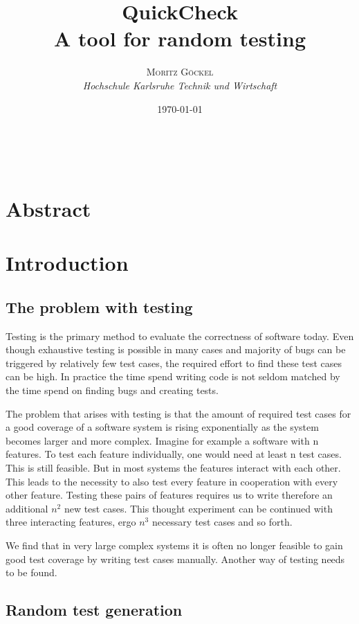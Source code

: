 \documentclass[a4paper, 12pt]{article} %
\title{\textbf{QuickCheck}\\ %
A tool for random testing} %
\author{\textsc{Moritz G\"ockel} %
\\{\textit{Hochschule Karlsruhe Technik und Wirtschaft}}} %
\date{\today}
\makeatletter
\renewcommand{\maketitle}{ 
\begin{flushright} %
{\LARGE\@title} %

\vspace{50pt} %

{\large\@author}
\\\@date 

\vspace{40pt}
\end{flushright}
}
\makeatother
\begin{document}
\maketitle

\vspace{30pt}

\newpage
\tableofcontents
\newpage

\section{Abstract}

\section{Introduction}
\subsection{The problem with testing}

Testing is the primary method to evaluate the correctness of software today. \cite{Ammann2016} Even though exhaustive testing is possible in many cases and majority of bugs can be triggered by relatively few test cases, \cite{Kuhn2004} the required effort to find these test cases can be high. In practice the time spend writing code is not seldom matched by the time spend on finding bugs and creating tests.

The problem that arises with testing is that the amount of required test cases for a good coverage of a software system is rising exponentially as the system becomes larger and more complex. Imagine for example a software with n features. To test each feature individually, one would need at least n test cases. This is still feasible. But in most systems the features interact with each other. This leads to the necessity to also test every feature in cooperation with every other feature. Testing these pairs of features requires us to write therefore an additional $n^2$  new test cases. This thought experiment can be continued with three interacting features, ergo $n^3$ necessary test cases and so forth. \cite{Hughes2016}

We find that in very large complex systems it is often no longer feasible to gain good test coverage by writing test cases manually. Another way of testing needs to be found. 

\subsection{Random test generation}
\end{document}

